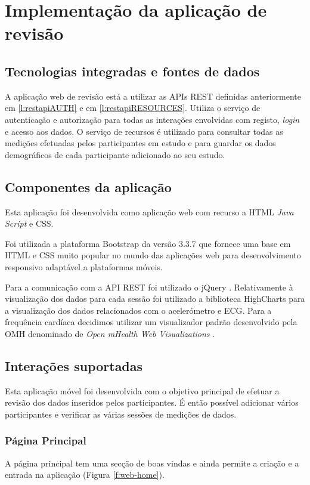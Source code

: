 \section{Implementação da aplicação de revisão}
\subsection{Tecnologias integradas e fontes de dados}

A aplicação web de revisão está a utilizar as \gls{API}s \gls{REST} definidas anteriormente em \ref{l:restapiAUTH} e em \ref{l:restapiRESOURCES}. Utiliza o serviço de autenticação e autorização para todas as interações envolvidas com registo, \textit{login} e acesso aos dados. O serviço de recursos é utilizado para consultar todas as medições efetuadas pelos participantes em estudo e para guardar os dados demográficos de cada participante adicionado ao seu estudo.\par

\subsection{Componentes da aplicação}
Esta aplicação foi desenvolvida como aplicação web com recurso a \gls{HTML} \textit{Java Script} e \gls{CSS}. \par 
Foi utilizada a plataforma Bootstrap \cite{bootstrap} da versão 3.3.7 que fornece uma base em \gls{HTML} e \gls{CSS} muito popular no mundo das aplicações web para desenvolvimento responsivo adaptável a plataformas móveis. \par
Para a comunicação com a \gls{API} \gls{REST} foi utilizado o jQuery \cite{jquery}.
Relativamente à visualização dos dados para cada sessão foi utilizado a biblioteca HighCharts \cite{highcharts} para a visualização dos dados relacionados com o acelerómetro e \gls{ECG}. Para a frequência cardíaca decidimos utilizar um visualizador padrão desenvolvido pela \gls{OMH} denominado de \textit{Open mHealth Web Visualizations} \cite{omhwebvisualizations}.

\subsection{Interações suportadas }


Esta aplicação móvel foi desenvolvida com o objetivo principal de efetuar a revisão dos dados inseridos pelos participantes. É então possível adicionar vários participantes e verificar as várias sessões de medições de dados.
\subsubsection{Página Principal}
A página principal tem uma secção de boas vindas e ainda permite a criação e a entrada na aplicação (Figura \ref{f:web-home}).

